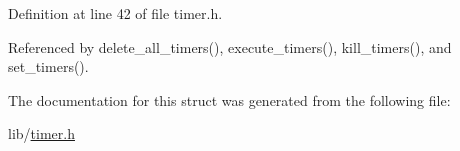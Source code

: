 Definition at line 42 of file timer.\-h.



Referenced by delete\-\_\-all\-\_\-timers(), execute\-\_\-timers(), kill\-\_\-timers(), and set\-\_\-timers().



The documentation for this struct was generated from the following file\-:\begin{DoxyCompactItemize}
\item 
lib/\hyperlink{timer_8h}{timer.\-h}\end{DoxyCompactItemize}
